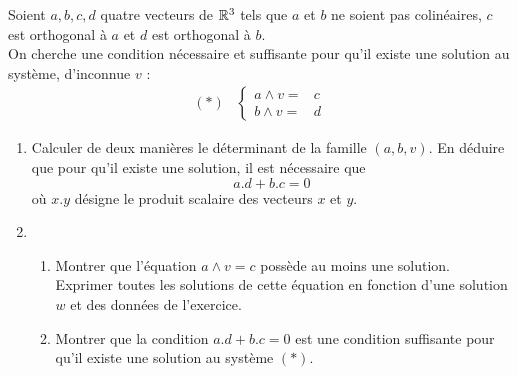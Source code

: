 Soient $a,b,c,d$ quatre vecteurs de $\mathbb{R}^3$ tels que $a$ et $b$ ne
soient pas colinéaires, $c$ est orthogonal à $a$ et $d$ est
orthogonal à $b$.\\
On cherche une condition nécessaire et suffisante pour qu'il existe
une solution au système, d'inconnue $v$ :
\begin{align*}
(*) &
\left\{
 \begin{aligned}
            a\wedge v  = & c \\
            b\wedge v  = & d
\end{aligned}
\right. 
\end{align*}
\begin{enumerate}
  \item Calculer de deux manières le déterminant de la famille  $(a,b,v)$. En déduire que pour qu'il existe une solution, il est  nécessaire que 
\begin{displaymath}
a.d+b.c=0 
\end{displaymath}
où $x.y$ désigne le produit scalaire des vecteurs $x$ et $y$.
  \item \begin{enumerate}
  \item
  Montrer que l'équation $a\wedge v=c$ possède au moins une  solution. Exprimer toutes les solutions de cette équation
  en fonction d'une solution $w$ et des données de l'exercice.
  \item Montrer que la condition $a.d+b.c=0$ est une condition suffisante pour qu'il existe une solution au système $(*)$.
          \end{enumerate}
\end{enumerate}
